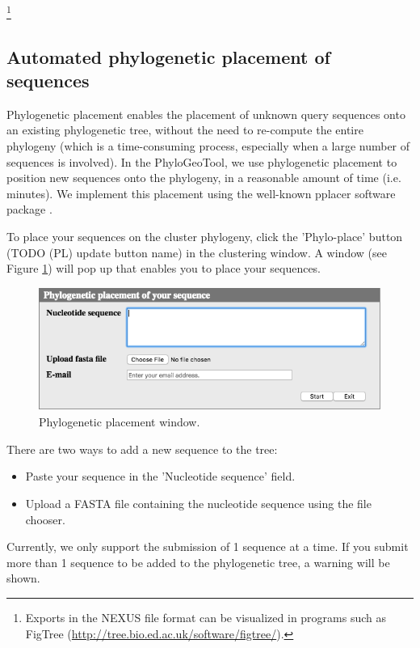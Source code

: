 \documentclass[a4paper, 11pt]{article} %
\begin{document}
\footnote{Exports in the NEXUS file format can be visualized in programs such as FigTree (\url{http://tree.bio.ed.ac.uk/software/figtree/}).}  

\subsection{Automated phylogenetic placement of sequences}
Phylogenetic placement enables the placement of unknown query sequences onto an existing phylogenetic tree, without the need to re-compute the entire phylogeny (which is a time-consuming process, especially when a large number of sequences is involved). 
In the PhyloGeoTool, we use phylogenetic placement to position new sequences onto the phylogeny, in a reasonable amount of time (i.e. minutes). 
We implement this placement using the well-known pplacer software package \cite{Matsen2010}.

To place your sequences on the cluster phylogeny, click the 'Phylo-place' button (TODO (PL) update button name) in the clustering window. 
A window (see Figure \ref{fig:pplacerwindow}) will pop up that enables you to place your sequences. 

\begin{figure}[H]
\centering
\includegraphics[scale=0.50]{images/pplacerWindow.png}
\vspace{-0.25cm}
\caption{Phylogenetic placement window.}
\label{fig:pplacerwindow}
\end{figure}

\noindent There are two ways to add a new sequence to the tree:
\begin{itemize}
\item Paste your sequence in the 'Nucleotide sequence' field.
\item Upload a FASTA file containing the nucleotide sequence using the file chooser.
\end{itemize}
Currently, we only support the submission of 1 sequence at a time.
If you submit more than 1 sequence to be added to the phylogenetic tree, a warning will be shown.
\end{document}
